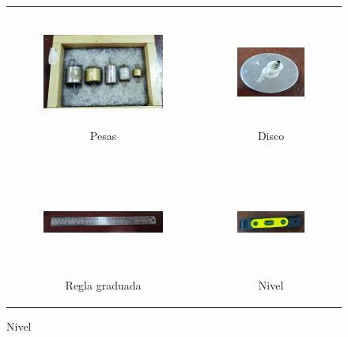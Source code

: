 \documentclass[../main.tex]{subfiles}
\begin{document}
\begin{figure}[H]

    \begin{tabular}{c c}
        
    \begin{subfigure}{0.5\textwidth} 
        \centering
        \includegraphics[width=0.8\linewidth, height=3.5cm]{images/materiales/mat1.jpg}
        \caption{Pesas}
        \label{fig:pesas}
    \end{subfigure}
    &
    \begin{subfigure}{0.5\textwidth}  
        \centering
        \includegraphics[width=0.8\linewidth, height=3.5cm]{images/materiales/mat2.jpg}
        \caption{Disco}
        \label{fig:disco}
    \end{subfigure} \\
    
    \begin{subfigure}{0.5\textwidth} 
        \centering
        \includegraphics[width=0.8\linewidth, height=3.5cm]{images/materiales/mat3.jpg}
        \caption{Regla graduada}
        \label{fig:regla}
    \end{subfigure}
    &
    \begin{subfigure}{0.5\textwidth}
        \centering
        \includegraphics[width=0.8\linewidth, height=3.5cm]{images/materiales/mat4.jpg}
        \caption{Nivel}
        \label{fig:nivel}
    \end{subfigure} \\
    

\end{tabular}
\end{figure}
\end{document}
